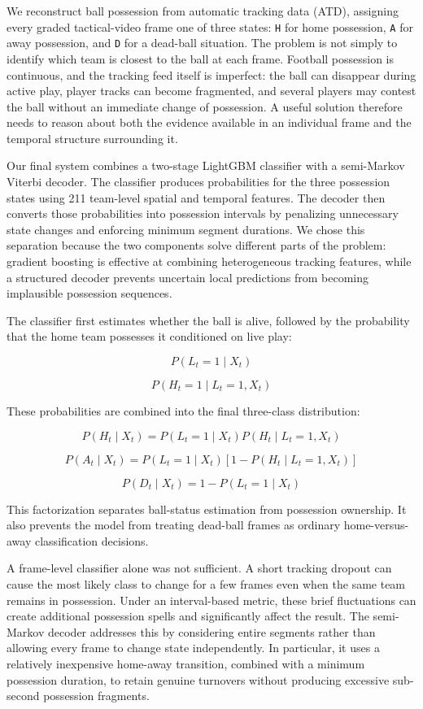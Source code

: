 \documentclass[11pt,a4paper]{article}
\begin{document}
We reconstruct ball possession from automatic tracking data (ATD), assigning every graded tactical-video frame one of three states: \texttt{H} for home possession, \texttt{A} for away possession, and \texttt{D} for a dead-ball situation. The problem is not simply to identify which team is closest to the ball at each frame. Football possession is continuous, and the tracking feed itself is imperfect: the ball can disappear during active play, player tracks can become fragmented, and several players may contest the ball without an immediate change of possession. A useful solution therefore needs to reason about both the evidence available in an individual frame and the temporal structure surrounding it.

Our final system combines a two-stage LightGBM classifier with a semi-Markov Viterbi decoder. The classifier produces probabilities for the three possession states using 211 team-level spatial and temporal features. The decoder then converts those probabilities into possession intervals by penalizing unnecessary state changes and enforcing minimum segment durations. We chose this separation because the two components solve different parts of the problem: gradient boosting is effective at combining heterogeneous tracking features, while a structured decoder prevents uncertain local predictions from becoming implausible possession sequences.

The classifier first estimates whether the ball is alive, followed by the probability that the home team possesses it conditioned on live play:

\[
P(L_t=1\mid X_t)
\]

\[
P(H_t=1\mid L_t=1,X_t)
\]

These probabilities are combined into the final three-class distribution:

\[
P(H_t\mid X_t)
=
P(L_t=1\mid X_t)
P(H_t\mid L_t=1,X_t)
\]

\[
P(A_t\mid X_t)
=
P(L_t=1\mid X_t)
\left[1-P(H_t\mid L_t=1,X_t)\right]
\]

\[
P(D_t\mid X_t)
=
1-P(L_t=1\mid X_t)
\]

This factorization separates ball-status estimation from possession ownership. It also prevents the model from treating dead-ball frames as ordinary home-versus-away classification decisions.

A frame-level classifier alone was not sufficient. A short tracking dropout can cause the most likely class to change for a few frames even when the same team remains in possession. Under an interval-based metric, these brief fluctuations can create additional possession spells and significantly affect the result. The semi-Markov decoder addresses this by considering entire segments rather than allowing every frame to change state independently. In particular, it uses a relatively inexpensive home-away transition, combined with a minimum possession duration, to retain genuine turnovers without producing excessive sub-second possession fragments.
\end{document}
